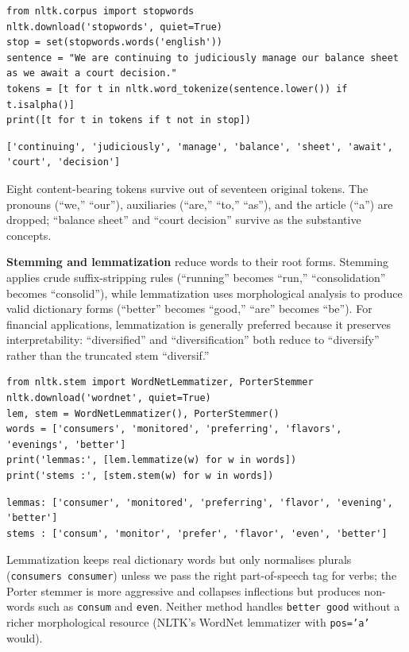 \begin{verbatim}
from nltk.corpus import stopwords
nltk.download('stopwords', quiet=True)
stop = set(stopwords.words('english'))
sentence = "We are continuing to judiciously manage our balance sheet as we await a court decision."
tokens = [t for t in nltk.word_tokenize(sentence.lower()) if t.isalpha()]
print([t for t in tokens if t not in stop])
\end{verbatim}

\begin{verbatim}
['continuing', 'judiciously', 'manage', 'balance', 'sheet', 'await', 'court', 'decision']
\end{verbatim}

Eight content-bearing tokens survive out of seventeen original tokens. The pronouns (``we,'' ``our''), auxiliaries (``are,'' ``to,'' ``as''), and the article (``a'') are dropped; ``balance sheet'' and ``court decision'' survive as the substantive concepts.

\textbf{Stemming and lemmatization} reduce words to their root forms. Stemming applies crude suffix-stripping rules (``running'' becomes ``run,'' ``consolidation'' becomes ``consolid''), while lemmatization uses morphological analysis to produce valid dictionary forms (``better'' becomes ``good,'' ``are'' becomes ``be''). For financial applications, lemmatization is generally preferred because it preserves interpretability: ``diversified'' and ``diversification'' both reduce to ``diversify'' rather than the truncated stem ``diversif.''

\begin{verbatim}
from nltk.stem import WordNetLemmatizer, PorterStemmer
nltk.download('wordnet', quiet=True)
lem, stem = WordNetLemmatizer(), PorterStemmer()
words = ['consumers', 'monitored', 'preferring', 'flavors', 'evenings', 'better']
print('lemmas:', [lem.lemmatize(w) for w in words])
print('stems :', [stem.stem(w) for w in words])
\end{verbatim}

\begin{verbatim}
lemmas: ['consumer', 'monitored', 'preferring', 'flavor', 'evening', 'better']
stems : ['consum', 'monitor', 'prefer', 'flavor', 'even', 'better']
\end{verbatim}

Lemmatization keeps real dictionary words but only normalises plurals (\texttt{consumers \rightarrow consumer}) unless we pass the right part-of-speech tag for verbs; the Porter stemmer is more aggressive and collapses inflections but produces non-words such as \texttt{consum} and \texttt{even}. Neither method handles \texttt{better \rightarrow good} without a richer morphological resource (NLTK's WordNet lemmatizer with \texttt{pos='a'} would).

